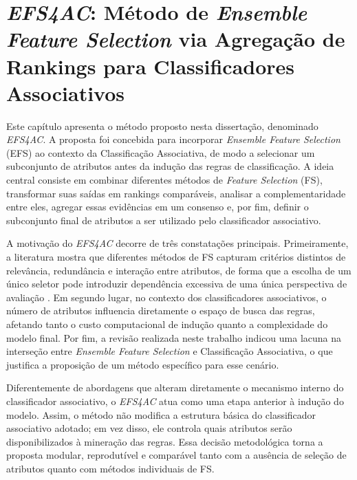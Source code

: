 %
\chapter{\textit{EFS4AC}: Método de \textit{Ensemble Feature Selection} via Agregação de Rankings para Classificadores Associativos}\label{cap:Metodologia}

Este capítulo apresenta o método proposto nesta dissertação, denominado
\textit{EFS4AC}. A proposta foi concebida para incorporar \textit{Ensemble
Feature Selection} (EFS) ao contexto da Classificação Associativa, de modo a
selecionar um subconjunto de atributos antes da indução das regras de
classificação. A ideia central consiste em combinar diferentes métodos de
\textit{Feature Selection} (FS), transformar suas saídas em rankings
comparáveis, analisar a complementaridade entre eles, agregar essas evidências
em um consenso e, por fim, definir o subconjunto final de atributos a ser
utilizado pelo classificador associativo.

A motivação do \textit{EFS4AC} decorre de três constatações principais.
Primeiramente, a literatura mostra que diferentes métodos de FS capturam
critérios distintos de relevância, redundância e interação entre atributos,
de forma que a escolha de um único seletor pode introduzir dependência excessiva
de uma única perspectiva de avaliação .
Em segundo lugar, no contexto dos classificadores associativos, o número de
atributos influencia diretamente o espaço de busca das regras, afetando tanto o
custo computacional de indução quanto a complexidade do modelo final. Por fim,
a revisão realizada neste trabalho indicou uma lacuna na interseção entre
\textit{Ensemble Feature Selection} e Classificação Associativa, o que justifica
a proposição de um método específico para esse cenário.

Diferentemente de abordagens que alteram diretamente o mecanismo interno do
classificador associativo, o \textit{EFS4AC} atua como uma etapa anterior à
indução do modelo. Assim, o método não modifica a estrutura básica do
classificador associativo adotado; em vez disso, ele controla quais atributos
serão disponibilizados à mineração das regras. Essa decisão metodológica torna a
proposta modular, reprodutível e comparável tanto com a ausência de seleção de
atributos quanto com métodos individuais de FS.

